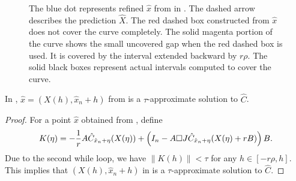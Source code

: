 \begin{figure}
    \centering
    
    \caption{The blue dot represents refined $\hat{x}$ from  in . The dashed arrow describes the prediction $\hat{X}$. The red dashed box constructed from $\hat{x}$ does not cover the curve completely. The solid magenta portion of the curve shows the small uncovered gap when the red dashed box is used. It is covered by the interval extended backward by $r\rho$. The solid black boxes represent actual intervals computed to cover the curve.}
    \label{fig:retract_box}
\end{figure}



\begin{lemma}
    In , $\hat{x}=(X(h),\hat{x}_n+h)$ from  is a $\tau$-approximate solution to $\hat{C}$.
\end{lemma}
\begin{proof}
For a point $\hat{x}$ obtained from , define
$$K(\eta)=-\frac{1}{r}A \hat{C}_{\hat{x}_n+\eta}(X(\eta))\\+\left(I_n-A\square J\hat{C}_{\hat{x}_n+\eta}(X(\eta)+rB)\right)B.$$ 
    Due to the second while loop, we have $\|K(h)\|< \tau$
    for any $h\in [-r\rho,h]$. This implies that $(X(h),\hat{x}_n+h)$ in  is a $\tau$-approximate solution to $\hat{C}$.
\end{proof}


